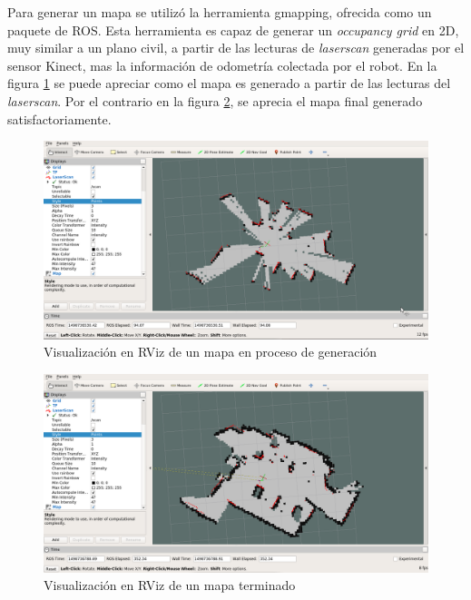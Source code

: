 Para generar un mapa se utilizó la herramienta gmapping\protect\footnotemark, ofrecida como un paquete de ROS. Esta herramienta es capaz de generar un \textit{occupancy grid} en 2D, muy similar a un plano civil, a partir de las lecturas de \textit{laserscan} generadas por el sensor Kinect, mas la información de odometría colectada por el robot. En la figura \ref{fig:creacion_mapa_rviz} se puede apreciar como el mapa es generado a partir de las lecturas del \textit{laserscan}. Por el contrario en la figura \ref{fig:mapa_rviz}, se aprecia el mapa final generado satisfactoriamente.

\begin{figure}[h]
    \centering
    \includegraphics[scale=.25]{./Figures/creacion_mapa_rviz.png}
    \caption{Visualización en RViz de un mapa en proceso de generación}
    \label{fig:creacion_mapa_rviz}
\end{figure}

\begin{figure}[h]
    \centering
    \includegraphics[scale=.25]{./Figures/map_rviz.png}
    \caption{Visualización en RViz de un mapa terminado}
    \label{fig:mapa_rviz}
\end{figure}

